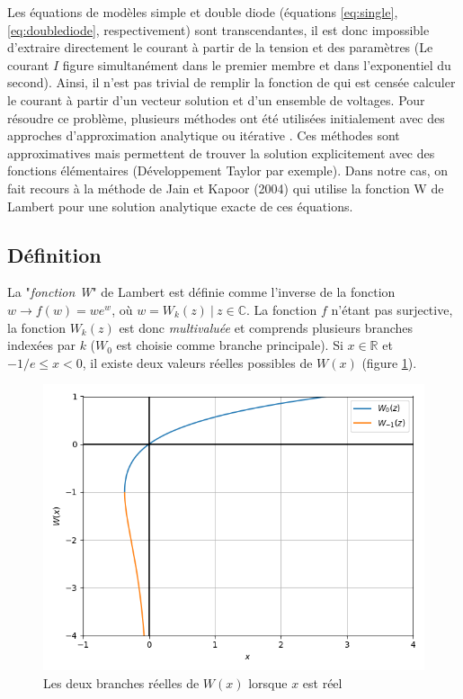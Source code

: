 Les équations de modèles simple et double diode (équations \ref{eq:single}, \ref{eq:doublediode}, respectivement) sont transcendantes, il est donc impossible d'extraire directement le courant à partir de la tension et des paramètres (Le courant $I$ figure simultanément dans le premier membre et dans l'exponentiel du second). Ainsi, il n'est pas trivial de remplir la fonction de  qui est censée calculer le courant à partir d'un vecteur solution et d'un ensemble de voltages. Pour résoudre ce problème, plusieurs méthodes ont été utilisées initialement avec des approches d'approximation analytique ou itérative \cite{Shur1991,AbuelmaAtti1992,Datta1992}. Ces méthodes sont approximatives mais permettent de trouver la solution explicitement avec des fonctions élémentaires (Développement Taylor par exemple). Dans notre cas, on fait recours à la méthode de Jain et Kapoor (2004) \cite{Jain2004, Lun2015} qui utilise la fonction W de Lambert pour une solution analytique exacte de ces équations.

\subsection{Définition}
La "\textit{fonction W}" de Lambert est définie comme l'inverse de la fonction $w \rightarrow f(w) =  w e^w$, où $w = W_k(z)\ |\ z \in \mathbb{C}$. La fonction $f$ n'étant pas surjective, la fonction $W_k(z)$ est donc \textit{multivaluée} et comprends plusieurs branches indexées par $k$ ($W_0$ est choisie comme branche principale). Si $x \in \mathbb{R}$ et $-1/e \leq x < 0$, il existe deux valeurs réelles possibles de $W(x)$ (figure \ref{fig:lambertw}).

\begin{figure}[H]
  \begin{center}
    \includegraphics[width=.6\textwidth]{resources/lambertw.png}
    \caption{Les deux branches réelles de $W(x)$ lorsque $x$ est réel}
    \label{fig:lambertw}
  \end{center}
\end{figure}

